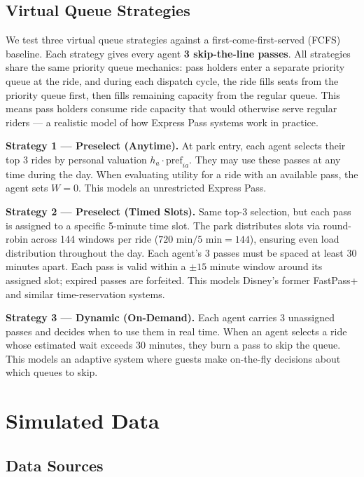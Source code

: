 \documentclass[11pt]{article}
\begin{document}
\subsection{Virtual Queue Strategies}

We test three virtual queue strategies against a first-come-first-served (FCFS) baseline. Each strategy gives every agent \textbf{3 skip-the-line passes}. All strategies share the same priority queue mechanics: pass holders enter a separate priority queue at the ride, and during each dispatch cycle, the ride fills seats from the priority queue first, then fills remaining capacity from the regular queue. This means pass holders consume ride capacity that would otherwise serve regular riders --- a realistic model of how Express Pass systems work in practice.

\textbf{Strategy 1 --- Preselect (Anytime).} At park entry, each agent selects their top 3 rides by personal valuation $h_a \cdot \text{pref}_{ia}$. They may use these passes at any time during the day. When evaluating utility for a ride with an available pass, the agent sets $W = 0$. This models an unrestricted Express Pass.

\textbf{Strategy 2 --- Preselect (Timed Slots).} Same top-3 selection, but each pass is assigned to a specific 5-minute time slot. The park distributes slots via round-robin across 144 windows per ride ($720 \text{ min} / 5 \text{ min} = 144$), ensuring even load distribution throughout the day. Each agent's 3 passes must be spaced at least 30 minutes apart. Each pass is valid within a $\pm 15$ minute window around its assigned slot; expired passes are forfeited. This models Disney's former FastPass+ and similar time-reservation systems.

\textbf{Strategy 3 --- Dynamic (On-Demand).} Each agent carries 3 unassigned passes and decides when to use them in real time. When an agent selects a ride whose estimated wait exceeds 30 minutes, they burn a pass to skip the queue. This models an adaptive system where guests make on-the-fly decisions about which queues to skip.

\section{Simulated Data}

\subsection{Data Sources}
\end{document}
